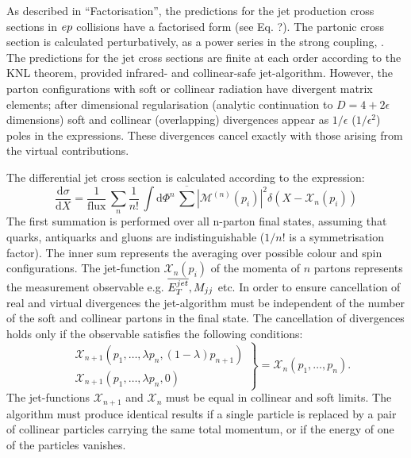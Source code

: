 As described in ``Factorisation'', the predictions for the jet production cross sections in $\mbox{$e p$}$ collisions have a factorised form (see Eq. ?). The partonic cross section is calculated perturbatively, as a power series in the strong coupling, \as. The predictions for the jet cross sections are finite at each order according to the KNL theorem\cite{KNL}, provided infrared- and collinear-safe jet-algorithm. However, the parton configurations with soft or collinear radiation have divergent matrix elements; after dimensional regularisation (analytic continuation to $D=4+2\epsilon$ dimensions) soft and collinear (overlapping) divergences appear as $1/\epsilon$ ($1/\epsilon^2$) poles in the expressions. These divergences cancel exactly with those arising from the virtual contributions.

The differential jet cross section is calculated according to the expression:
\begin{equation}
\frac{\mathrm{d}\sigma}{\mathrm{d}X} = \frac{1}{\text{flux}}\, \sum_n{ \frac{1}{n!} \, \int{\mathrm{d}\Phi^{n}} \, \overline{\sum}{ \left| \mathcal{M}^{\left(n\right)}\left(p_i\right) \right|^2 } \delta\left( X - \mathcal{X}_n\left( p_i\right)\right)}
\label{eq:}
\end{equation}
The first summation is performed over all n-parton final states, assuming that quarks, antiquarks and gluons are indistinguishable ($1/n!$ is a symmetrisation factor). The inner sum represents the averaging over possible colour and spin configurations. The jet-function $\mathcal{X}_n\left( p_i\right)$ of the momenta of $n$ partons represents the measurement observable e.g. $\mbox{$\overline{E_T^{jet}}$}, \mbox{$M_{jj}$}$ etc. In order to ensure cancellation of real and virtual divergences the jet-algorithm must be independent of the number of the soft and collinear partons in the final state. The cancellation of divergences holds only if the observable satisfies the following conditions:
\begin{equation}
\left.
\begin{aligned}
	&\mathcal{X}_{n+1}\left( p_1,\dots,\lambda p_n,\left(1-\lambda\right)p_{n+1}\right)\\
	&\mathcal{X}_{n+1}\left( p_1,\dots,\lambda p_n,0\right)
\end{aligned}
\right\} = \mathcal{X}_{n}\left( p_1,\dots, p_n\right).
\label{eq:}
\end{equation}
The jet-functions $\mathcal{X}_{n+1}$ and $\mathcal{X}_{n}$ must be equal in collinear and soft limits. The algorithm must produce identical results if a single particle is replaced by a pair of collinear particles carrying the same total momentum, or if the energy of one of the particles vanishes.

